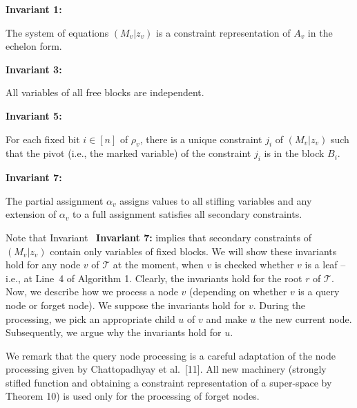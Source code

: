\documentclass[10pt,a4paper]{article}
\begin{document}
\textbf{ Invariant 1:}



The system of equations $(M_{v}|z_{v})$ is a constraint representation of $A_{v}$ in the echelon form.\par



\textbf{ Invariant 3:}



All variables of all free blocks are independent.\par



\textbf{ Invariant 5:}



For each fixed bit $i\in[n]$ of $\rho_{v}$, there is a unique constraint $j_{i}$ of $(M_{v}|z_{v})$ such that the pivot (i.e., the marked variable) of the constraint $j_{i}$ is in the block $B_{i}$.\par



\textbf{ Invariant 7:}



The partial assignment $\alpha_{v}$ assigns values to all stifling variables and any extension of $\alpha_{v}$ to a full assignment satisfies all secondary constraints.\par







Note that Invariant \textbf{ Invariant 7:} implies that secondary constraints of $(M_{v}|z_{v})$ contain only variables of fixed blocks.
We will show these invariants hold for any node $v$ of $\mathcal{T}$ at the moment, when $v$ is checked whether $v$ is a leaf – i.e., at Line 4 of Algorithm 1.
Clearly, the invariants hold for the root $r$ of $\mathcal{T}$.
Now, we describe how we process a node $v$ (depending on whether $v$ is a query node or forget node).
We suppose the invariants hold for $v$.
During the processing, we pick an appropriate child $u$ of $v$ and make $u$ the new current node.
Subsequently, we argue why the invariants hold for $u$.\par




We remark that the query node processing is a careful adaptation of the node processing given by Chattopadhyay et al. [11].
All new machinery (strongly stifled function and obtaining a constraint representation of a super-space by Theorem 10) is used only for the processing of forget nodes.\par
\end{document}

